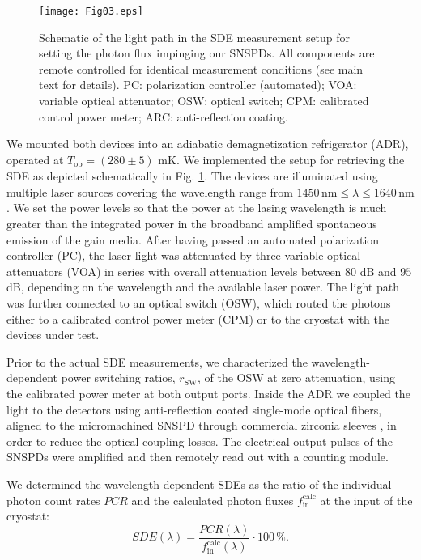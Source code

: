 \documentclass[aip,apl,showpacs,showkeys,preprint,superscriptaddress,preprintnumbers,amsmath,amssymb]{revtex4-1}
\begin{document}
\begin{bibunit}
\begin{figure}
\texttt{[image: Fig03.eps]}
\caption{\label{fig:03} Schematic of the light path in the SDE measurement setup for setting the photon flux impinging our SNSPDs. All components are remote controlled for identical measurement conditions (see main text for details). PC: polarization controller (automated); VOA: variable optical attenuator; OSW: optical switch; CPM: calibrated control power meter; ARC: anti-reflection coating.}
\end{figure}

We mounted both devices into an adiabatic demagnetization refrigerator (ADR), operated at $T_\mathrm{op}=(280\pm5)$ mK. We implemented the setup for retrieving the SDE as depicted schematically in Fig. \ref{fig:03}. The devices are illuminated using multiple laser sources covering the wavelength range from $1450\,\mathrm{nm}\le\lambda\le1640\,\mathrm{nm}$. We set the power levels so that the power at the lasing wavelength is much greater than the integrated power in the broadband amplified spontaneous emission of the gain media. After having passed an automated polarization controller (PC), the laser light was attenuated by three variable optical attenuators (VOA) in series with overall attenuation levels between $80$ dB and $95$ dB, depending on the wavelength and the available laser power. The light path was further connected to an optical switch (OSW), which routed the photons either to a calibrated control power meter (CPM) or to the cryostat with the devices under test. 

Prior to the actual SDE measurements, we characterized the wavelength-dependent power switching ratios, $r_\mathrm{SW}$, of the OSW at zero attenuation, using the calibrated power meter at both output ports. Inside the ADR we coupled the light to the detectors using anti-reflection coated single-mode optical fibers, aligned to the micromachined SNSPD through commercial zirconia sleeves \cite{Miller2011}, in order to reduce the optical coupling losses. The electrical output pulses of the SNSPDs were amplified and then remotely read out with a counting module.

We determined the wavelength-dependent SDEs as the ratio of the individual photon count rates $PCR$ and the calculated photon fluxes $f^\mathrm{calc}_\mathrm{in}$ at the input of the cryostat:
\begin{equation*}
SDE\left(\lambda\right)=\frac{PCR\left(\lambda\right)}{f^\mathrm{calc}_\mathrm{in}\left(\lambda\right)}\cdot 100\,\%.
\end{equation*}


\end{bibunit}
\end{document}
